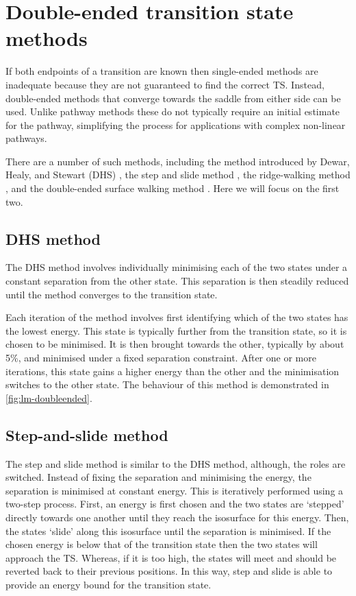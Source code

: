 \section{Double-ended transition state methods}\label{sec:lm-de}
If both endpoints of a transition are known then single-ended methods are inadequate because they are not guaranteed to find the correct TS.
Instead, double-ended methods that converge towards the saddle from either side can be used.
Unlike pathway methods these do not typically require an initial estimate for the pathway, simplifying the process for applications with complex non-linear pathways.

There are a number of such methods, including the method introduced by Dewar, Healy, and Stewart (DHS) \cite{Dewar1984}, the step and slide method \cite{Miron2001}, the ridge-walking method \cite{Ionova1993}, and the double-ended surface walking method \cite{Zhang2013}.
Here we will focus on the first two.


\subsection{DHS method}
The DHS method \cite{Dewar1984} involves individually minimising each of the two states under a constant separation from the other state.
This separation is then steadily reduced until the method converges to the transition state.

Each iteration of the method involves first identifying which of the two states has the lowest energy.
This state is typically further from the transition state, so it is chosen to be minimised.
It is then brought towards the other, typically by about 5\%, and minimised under a fixed separation constraint.
After one or more iterations, this state gains a higher energy than the other and the minimisation switches to the other state.
The behaviour of this method is demonstrated in \cref{fig:lm-doubleended}.


\subsection{Step-and-slide method}
The step and slide method \cite{Miron2001} is similar to the DHS method, although, the roles are switched.
Instead of fixing the separation and minimising the energy, the separation is minimised at constant energy.
This is iteratively performed using a two-step process.
First, an energy is first chosen and the two states are `stepped' directly towards one another until they reach the isosurface for this energy.
Then, the states `slide' along this isosurface until the separation is minimised.
If the chosen energy is below that of the transition state then the two states will approach the TS.
Whereas, if it is too high, the states will meet and should be reverted back to their previous positions.
In this way, step and slide is able to provide an energy bound for the transition state.

